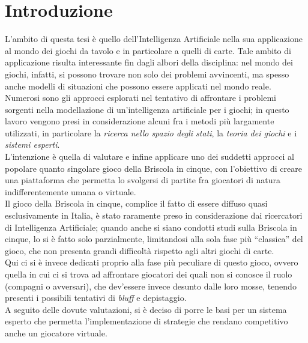 \chapter*{Introduzione}

\ifpdf
    \graphicspath{{Introduction/IntroductionFigs/PNG/}{Introduction/IntroductionFigs/PDF/}{Introduction/IntroductionFigs/}}
\else
    \graphicspath{{Introduction/IntroductionFigs/EPS/}{Introduction/IntroductionFigs/}}
\fi

L'ambito di questa tesi è quello dell'Intelligenza Artificiale nella sua applicazione al mondo dei giochi da tavolo e in particolare a quelli di carte. Tale ambito di applicazione risulta interessante fin dagli albori della disciplina: nel mondo dei giochi, infatti, si possono trovare non solo dei problemi avvincenti, ma spesso anche modelli di situazioni che possono essere applicati nel mondo reale.\\
Numerosi sono gli approcci esplorati nel tentativo di affrontare i problemi sorgenti nella modellazione di un'intelligenza artificiale per i giochi; in questo lavoro vengono presi in considerazione alcuni fra i metodi più largamente utilizzati, in particolare la \emph{ricerca nello spazio degli stati}, la \emph{teoria dei giochi} e i \emph{sistemi esperti}.\\
L'intenzione è quella di valutare e infine applicare uno dei suddetti approcci al popolare quanto singolare gioco della Briscola in cinque, con l'obiettivo di creare una piattaforma che permetta lo svolgersi di partite fra giocatori di natura indifferentemente umana o virtuale.\\
Il gioco della Briscola in cinque, complice il fatto di essere diffuso quasi esclusivamente in Italia, è stato raramente preso in considerazione dai ricercatori di Intelligenza Artificiale; quando anche si siano condotti studi sulla Briscola in cinque, lo si è fatto solo parzialmente, limitandosi alla sola fase più ``classica'' del gioco, che non presenta grandi difficoltà rispetto agli altri giochi di carte.\\
Qui ci si è invece dedicati proprio alla fase più peculiare di questo gioco, ovvero quella in cui ci si trova ad affrontare giocatori dei quali non si conosce il ruolo (compagni o avversari), che dev'essere invece desunto dalle loro mosse, tenendo presenti i possibili tentativi di \emph{bluff} e depistaggio.\\
A seguito delle dovute valutazioni, si è deciso di porre le basi per un sistema esperto che permetta l'implementazione di strategie che rendano competitivo anche un giocatore virtuale.



